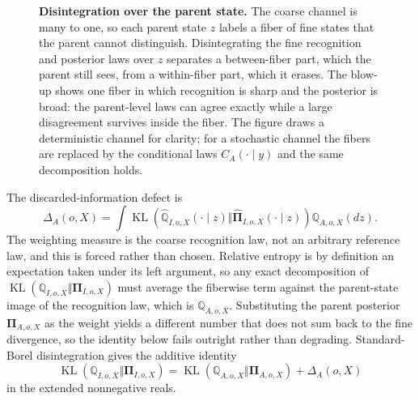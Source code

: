 \documentclass[11pt,letterpaper]{article}
\newcommand{\KL}{\operatorname{KL}}
\newcommand{\Rec}{\mathbb Q}
\newcommand{\Post}{\boldsymbol\Pi}
\begin{document}
\begin{figure}[ht]
{}
\caption{\textbf{Disintegration over the parent state.} The coarse channel is many to one, so each parent state \(z\) labels a fiber of fine states that the parent cannot distinguish. Disintegrating the fine recognition and posterior laws over \(z\) separates a between-fiber part, which the parent still sees, from a within-fiber part, which it erases. The blow-up shows one fiber in which recognition is sharp and the posterior is broad: the parent-level laws can agree exactly while a large disagreement survives inside the fiber. The figure draws a deterministic channel for clarity; for a stochastic channel the fibers are replaced by the conditional laws \(C_A(\cdot\mid y)\) and the same decomposition holds.}
\label{fig:disintegration}
\end{figure}

The discarded-information defect is
\begin{equation}
  \Delta_A(o,X)
  =
  \int
  \KL\left(
  \widehat{\Rec}_{I,o,X}(\cdot\mid z)
  \Vert
  \widehat{\Post}_{I,o,X}(\cdot\mid z)
  \right)
  \Rec_{A,o,X}(dz).
  \label{eq:defect}
\end{equation}
The weighting measure is the coarse recognition law, not an arbitrary reference law, and this is forced rather than chosen. Relative entropy is by definition an expectation taken under its left argument, so any exact decomposition of \(\KL(\Rec_{I,o,X}\Vert\Post_{I,o,X})\) must average the fiberwise term against the parent-state image of the recognition law, which is \(\Rec_{A,o,X}\). Substituting the parent posterior \(\Post_{A,o,X}\) as the weight yields a different number that does not sum back to the fine divergence, so the identity below fails outright rather than degrading. Standard-Borel disintegration gives the additive identity
\begin{equation}
  \KL(\Rec_{I,o,X}\Vert\Post_{I,o,X})
  =
  \KL(\Rec_{A,o,X}\Vert\Post_{A,o,X})
  +\Delta_A(o,X)
  \label{eq:kl-chain}
\end{equation}
in the extended nonnegative reals.
\end{document}
